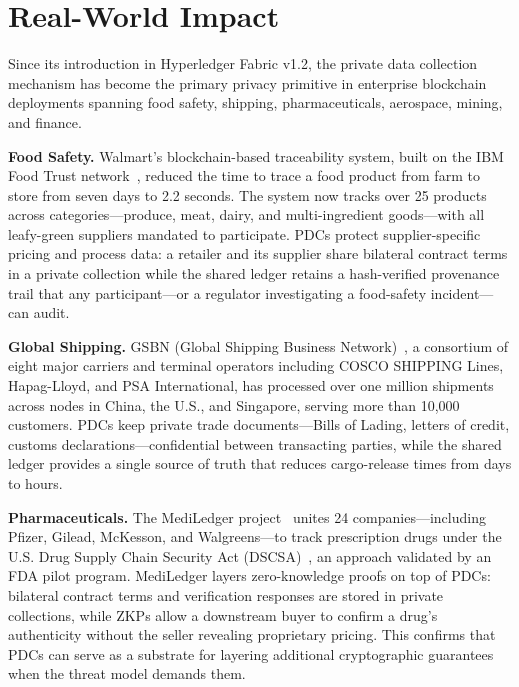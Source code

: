 \section{Real-World Impact}

Since its introduction in Hyperledger Fabric v1.2, the private data collection mechanism has become the primary privacy primitive in enterprise blockchain deployments spanning food safety, shipping, pharmaceuticals, aerospace, mining, and finance.

\textbf{Food Safety.}
Walmart's blockchain-based traceability system, built on the IBM Food Trust network~\cite{7-to-2, walmart-hf}, reduced the time to trace a food product from farm to store from seven days to 2.2 seconds. The system now tracks over 25 products across categories---produce, meat, dairy, and multi-ingredient goods---with all leafy-green suppliers mandated to participate. PDCs protect supplier-specific pricing and process data: a retailer and its supplier share bilateral contract terms in a private collection while the shared ledger retains a hash-verified provenance trail that any participant---or a regulator investigating a food-safety incident---can audit.

\textbf{Global Shipping.}
GSBN (Global Shipping Business Network)~\cite{gsbn}, a consortium of eight major carriers and terminal operators including COSCO SHIPPING Lines, Hapag-Lloyd, and PSA International, has processed over one million shipments across nodes in China, the U.S., and Singapore, serving more than 10,000 customers. PDCs keep private trade documents---Bills of Lading, letters of credit, customs declarations---confidential between transacting parties, while the shared ledger provides a single source of truth that reduces cargo-release times from days to hours.

\textbf{Pharmaceuticals.}
The MediLedger project~\cite{mediledger-fda, mediledger-hf} unites 24 companies---including Pfizer, Gilead, McKesson, and Walgreens---to track prescription drugs under the U.S. Drug Supply Chain Security Act (DSCSA)~\cite{dscsa}, an approach validated by an FDA pilot program. MediLedger layers zero-knowledge proofs on top of PDCs: bilateral contract terms and verification responses are stored in private collections, while ZKPs allow a downstream buyer to confirm a drug's authenticity without the seller revealing proprietary pricing. This confirms that PDCs can serve as a substrate for layering additional cryptographic guarantees when the threat model demands them.

